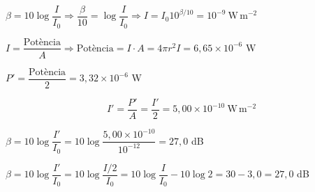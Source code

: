 \begin{solapartat}
 $\beta = 10\log\dfrac{I}{I_0} \Rightarrow \dfrac{\beta}{10} = \log\dfrac{I}{I_0} \Rightarrow I = I_0 10^{\beta/10} = 10^{-9}\ \mathrm{W\,m^{-2}}$

 $I = \dfrac{\text{Potència}}{A} \Rightarrow \text{Potència} = I\cdot A = 4\pi r^2 I = 6,65\times 10^{-6}$ W

 $P' = \dfrac{\text{Potència}}{2} = 3,32\times 10^{-6}$ W

\[ I' = \frac{P'}{A} = \frac{I'}{2} = 5,00\times 10^{-10}\ \mathrm{W\,m^{-2}} \]

 $\beta = 10\log\dfrac{I'}{I_0} = 10\log\dfrac{5,00\times 10^{-10}}{10^{-12}} = 27,0$ dB


 $\beta = 10\log\dfrac{I'}{I_0} = 10\log\dfrac{I/2}{I_0} = 10\log\dfrac{I}{I_0} - 10\log 2 = 30 - 3,0 = 27,0$ dB
\end{solapartat}
